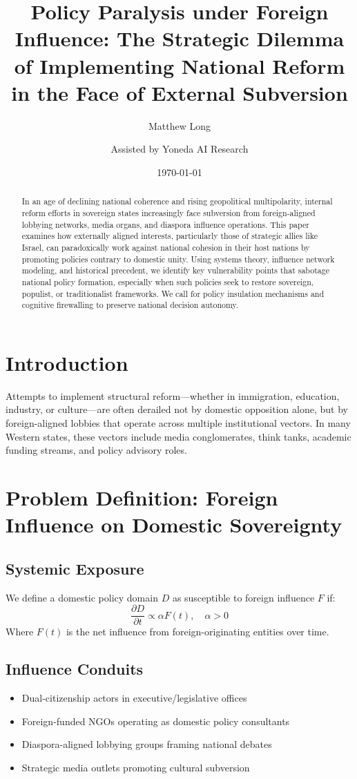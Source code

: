 \documentclass[11pt]{article}
\title{\textbf{Policy Paralysis under Foreign Influence: The Strategic Dilemma of Implementing National Reform in the Face of External Subversion}}
\author[1]{Matthew Long}
\author[2]{Assisted by Yoneda AI Research}
\affil[1]{Independent Geostrategic Analyst}
\affil[2]{AI-Augmented Sovereignty Lab}
\date{\today}
\begin{document}
\maketitle

\begin{abstract}
In an age of declining national coherence and rising geopolitical multipolarity, internal reform efforts in sovereign states increasingly face subversion from foreign-aligned lobbying networks, media organs, and diaspora influence operations. This paper examines how externally aligned interests, particularly those of strategic allies like Israel, can paradoxically work against national cohesion in their host nations by promoting policies contrary to domestic unity. Using systems theory, influence network modeling, and historical precedent, we identify key vulnerability points that sabotage national policy formation, especially when such policies seek to restore sovereign, populist, or traditionalist frameworks. We call for policy insulation mechanisms and cognitive firewalling to preserve national decision autonomy.
\end{abstract}

\section{Introduction}
Attempts to implement structural reform—whether in immigration, education, industry, or culture—are often derailed not by domestic opposition alone, but by foreign-aligned lobbies that operate across multiple institutional vectors. In many Western states, these vectors include media conglomerates, think tanks, academic funding streams, and policy advisory roles.

\section{Problem Definition: Foreign Influence on Domestic Sovereignty}
\subsection{Systemic Exposure}
We define a domestic policy domain $D$ as susceptible to foreign influence $F$ if:
\begin{equation}
\frac{\partial D}{\partial t} \propto \alpha F(t), \quad \alpha > 0
\end{equation}
Where $F(t)$ is the net influence from foreign-originating entities over time.

\subsection{Influence Conduits}
\begin{itemize}
    \item Dual-citizenship actors in executive/legislative offices
    \item Foreign-funded NGOs operating as domestic policy consultants
    \item Diaspora-aligned lobbying groups framing national debates
    \item Strategic media outlets promoting cultural subversion
\end{itemize}
\end{document}
